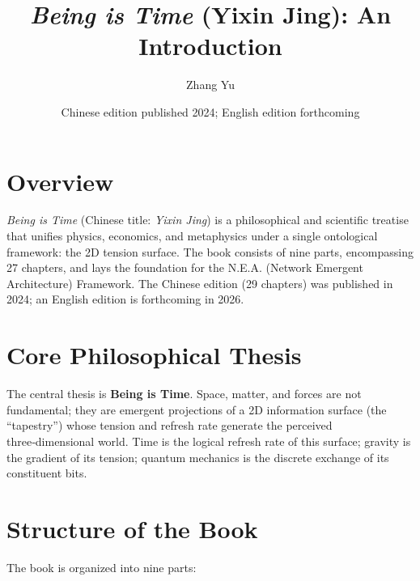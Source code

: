 \documentclass[12pt,a4paper]{article}
\title{\textit{Being is Time} (Yixin Jing): An Introduction}
\author{Zhang Yu}
\date{Chinese edition published 2024; English edition forthcoming}
\begin{document}
\maketitle

\section*{Overview}
\textit{Being is Time} (Chinese title: \textit{Yixin Jing}) is a philosophical and scientific treatise that unifies physics, economics, and metaphysics under a single ontological framework: the 2D tension surface. The book consists of nine parts, encompassing 27 chapters, and lays the foundation for the N.E.A. (Network Emergent Architecture) Framework. The Chinese edition (29 chapters) was published in 2024; an English edition is forthcoming in 2026.

\section*{Core Philosophical Thesis}
The central thesis is \textbf{Being is Time}. Space, matter, and forces are not fundamental; they are emergent projections of a 2D information surface (the “tapestry”) whose tension and refresh rate generate the perceived three‑dimensional world. Time is the logical refresh rate of this surface; gravity is the gradient of its tension; quantum mechanics is the discrete exchange of its constituent bits.

\section*{Structure of the Book}
The book is organized into nine parts:
\end{document}
